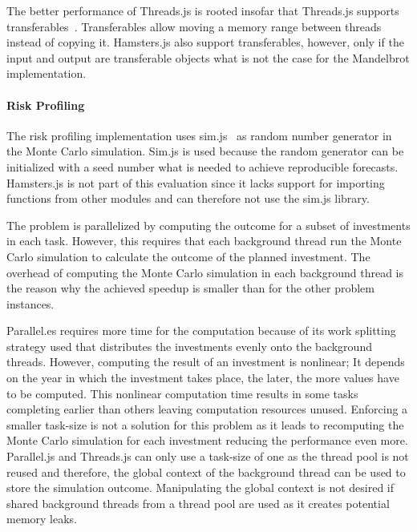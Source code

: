 The better performance of Threads.js is rooted insofar that Threads.js supports transferables~\cite[Section 2.7.4]{w3cHtml5}. Transferables allow moving a memory range between threads instead of copying it. Hamsters.js also support transferables, however, only if the input and output are transferable objects what is not the case for the Mandelbrot implementation.

\paragraph{Risk Profiling}
The risk profiling implementation uses sim.js~\cite{simjs} as random number generator in the Monte Carlo simulation. Sim.js is used because the random generator can be initialized with a seed number what is needed to achieve reproducible forecasts. Hamsters.js is not part of this evaluation since it lacks support for importing functions from other modules and can therefore not use the sim.js library. 

The problem is parallelized by computing the outcome for a subset of investments in each task. However, this requires that each background thread run the Monte Carlo simulation to calculate the outcome of the planned investment. The overhead of computing the Monte Carlo simulation in each background thread is the reason why the achieved speedup is smaller than for the other problem instances.

Parallel.es requires more time for the computation because of its work splitting strategy used that distributes the investments evenly onto the background threads. However, computing the result of an investment is nonlinear; It depends on the year in which the investment takes place, the later, the more values have to be computed. This nonlinear computation time results in some tasks completing earlier than others leaving computation resources unused. Enforcing a smaller task-size is not a solution for this problem as it leads to recomputing the Monte Carlo simulation for each investment reducing the performance even more. Parallel.js and Threads.js can only use a task-size of one as the thread pool is not reused and therefore, the global context of the background thread can be used to store the simulation outcome. Manipulating the global context is not desired if shared background threads from a thread pool are used as it creates potential memory leaks.

